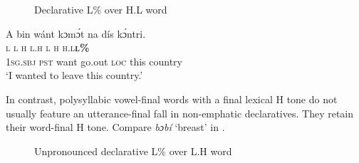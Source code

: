 \begin{figure}
\caption{Declarative L\% over H.L word}
\label{fig:key:3.27}
\end{figure}

 
\ea%
    \label{ex:key:80}
    \glll   A    bin  wánt  kɔmɔ́t  na  dís  kɔ́ntri.\\
\textsc{l}    \textsc{l}  \textsc{h}    \textsc{l.h}    \textsc{l}  \textsc{h}  \textsc{h.l}\textbf{\textsc{l\%}}\\
\textsc{1sg.sbj}  \textsc{pst}  want  go.out  \textsc{loc}  this  country\\
\glt ‘I wanted to leave this country.’
\z

In contrast, polysyllabic vowel-final words with a final lexical H tone do not usually feature an utterance-final fall in non-emphatic declaratives. They retain their word-final H tone. Compare \textit{bɔbí} ‘breast’ in .

\begin{figure}
\caption{Unpronounced declarative L\% over L.H word}
\label{fig:key:3.28}
\end{figure}
 


